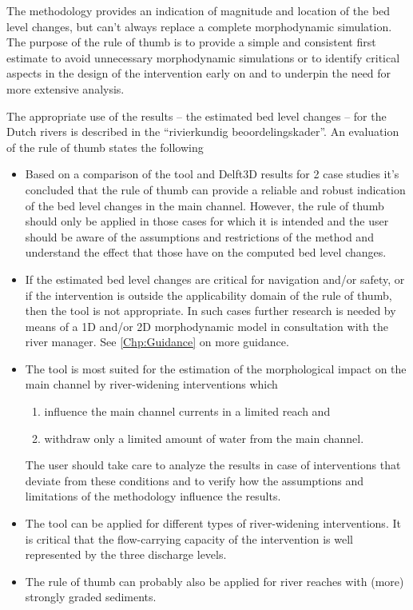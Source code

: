 The methodology provides an indication of magnitude and location of the bed level changes, but can't always replace a complete morphodynamic simulation.
The purpose of the rule of thumb is to provide a simple and consistent first estimate to avoid unnecessary morphodynamic simulations or to identify critical aspects in the design of the intervention early on and to underpin the need for more extensive analysis.

The appropriate use of the results -- the estimated bed level changes -- for the Dutch rivers is described in the ``rivierkundig beoordelingskader''.
An evaluation of the rule of thumb \citep{Paarlberg2009} states the following

\begin{itemize}

\item Based on a comparison of the tool and Delft3D results for 2 case studies it's concluded that the rule of thumb can provide a reliable and robust indication of the bed level changes in the main channel.
However, the rule of thumb should only be applied in those cases for which it is intended and the user should be aware of the assumptions and restrictions of the method and understand the effect that those have on the computed bed level changes.

\item If the estimated bed level changes are critical for navigation and/or safety, or if the intervention is outside the applicability domain of the rule of thumb, then the tool is not appropriate.
In such cases further research is needed by means of a 1D and/or 2D morphodynamic model in consultation with the river manager.
See \autoref{Chp:Guidance} on more guidance.

\item The tool is most suited for the estimation of the morphological impact on the main channel by river-widening interventions which
\begin{enumerate}
\item influence the main channel currents in a limited reach and
\item withdraw only a limited amount of water from the main channel.
\end{enumerate}
The user should take care to analyze the results in case of interventions that deviate from these conditions and to verify how the assumptions and limitations of the methodology influence the results.

\item The tool can be applied for different types of river-widening interventions.
It is critical that the flow-carrying capacity of the intervention is well represented by the three discharge levels.

\item The rule of thumb can probably also be applied for river reaches with (more) strongly graded sediments.
\end{itemize}

